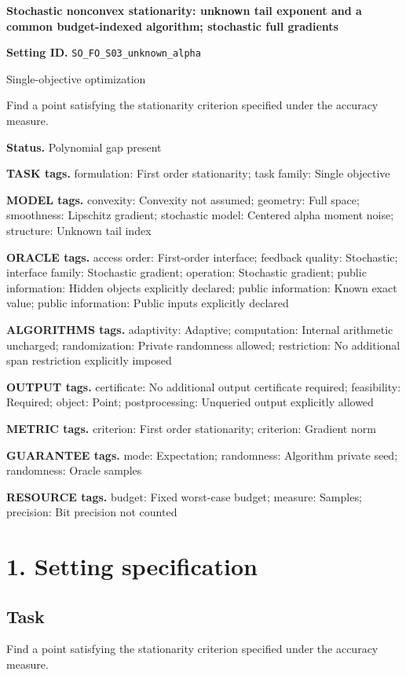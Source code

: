 \documentclass[10pt,a4paper]{article}
\begin{document}
\raggedright

{\LARGE\bfseries\sffamily\color{AtlasNavy} Stochastic nonconvex stationarity: unknown tail exponent and a common budget-indexed algorithm; stochastic full gradients\par}\vspace{5pt}
\textbf{Setting ID.} \texttt{SO\_\allowbreak{}FO\_\allowbreak{}S03\_\allowbreak{}unknown\_\allowbreak{}alpha}

Single-objective optimization

Find a point satisfying the stationarity criterion specified under the accuracy measure.

\textbf{Status.} Polynomial gap present

\textbf{TASK tags.} formulation: First order stationarity; task family: Single objective

\textbf{MODEL tags.} convexity: Convexity not assumed; geometry: Full space; smoothness: Lipschitz gradient; stochastic model: Centered alpha moment noise; structure: Unknown tail index

\textbf{ORACLE tags.} access order: First-order interface; feedback quality: Stochastic; interface family: Stochastic gradient; operation: Stochastic gradient; public information: Hidden objects explicitly declared; public information: Known exact value; public information: Public inputs explicitly declared

\textbf{ALGORITHMS tags.} adaptivity: Adaptive; computation: Internal arithmetic uncharged; randomization: Private randomness allowed; restriction: No additional span restriction explicitly imposed

\textbf{OUTPUT tags.} certificate: No additional output certificate required; feasibility: Required; object: Point; postprocessing: Unqueried output explicitly allowed

\textbf{METRIC tags.} criterion: First order stationarity; criterion: Gradient norm

\textbf{GUARANTEE tags.} mode: Expectation; randomness: Algorithm private seed; randomness: Oracle samples

\textbf{RESOURCE tags.} budget: Fixed worst-case budget; measure: Samples; precision: Bit precision not counted

\section{1. Setting specification}
\subsection{Task}
Find a point satisfying the stationarity criterion specified under the accuracy measure.
\end{document}
